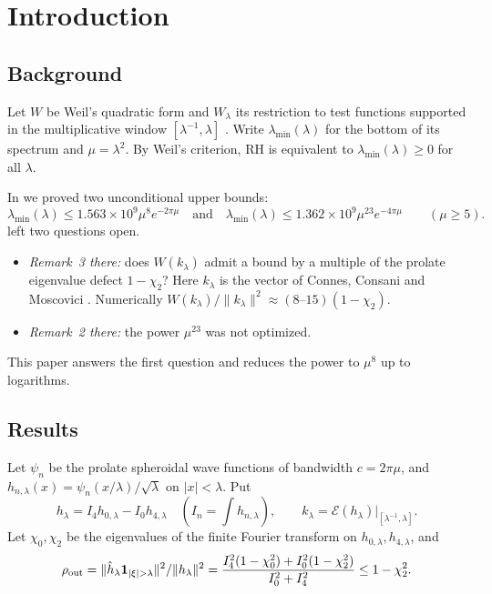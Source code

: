 \documentclass[11pt]{amsart}
\theoremstyle{remark}
\numberwithin{equation}{section}
\newcommand{\E}{\mathcal{E}}
\begin{document}
\begin{center}
\end{center}

\section{Introduction}

\subsection{Background}
Let $W$ be Weil's quadratic form and $W_\lambda$ its restriction to test functions supported in the multiplicative window $[\lambda^{-1},\lambda]$ \cite{CC21,CCM25}. Write $\lambda_{\min}(\lambda)$ for the bottom of its spectrum and $\mu=\lambda^2$. By Weil's criterion, RH is equivalent to $\lambda_{\min}(\lambda)\ge0$ for all $\lambda$.

In \cite{MoriWWUB} we proved two unconditional upper bounds:
\[
\lambda_{\min}(\lambda)\le1.563\times10^9\mu^8e^{-2\pi\mu}
\quad\text{and}\quad
\lambda_{\min}(\lambda)\le1.362\times10^9\mu^{23}e^{-4\pi\mu}\qquad(\mu\ge5).
\]
\cite{MoriWWUB} left two questions open.
\begin{itemize}
\item \emph{Remark~3 there:} does $W(k_\lambda)$ admit a bound by a multiple of the prolate eigenvalue defect $1-\chi_2$? Here $k_\lambda$ is the vector of Connes, Consani and Moscovici \cite[\S7]{CCM25}. Numerically $W(k_\lambda)/\|k_\lambda\|^2\approx(8\text{--}15)(1-\chi_2)$.
\item \emph{Remark~2 there:} the power $\mu^{23}$ was not optimized.
\end{itemize}
This paper answers the first question and reduces the power to $\mu^8$ up to logarithms.

\subsection{Results}
Let $\psi_n$ be the prolate spheroidal wave functions of bandwidth $c=2\pi\mu$, and $h_{n,\lambda}(x)=\psi_n(x/\lambda)/\sqrt\lambda$ on $|x|<\lambda$. Put
\[
h_\lambda=I_4h_{0,\lambda}-I_0h_{4,\lambda}\quad(I_n=\textstyle\int h_{n,\lambda}),\qquad k_\lambda=\E(h_\lambda)|_{[\lambda^{-1},\lambda]}.
\]
Let $\chi_0,\chi_2$ be the eigenvalues of the finite Fourier transform on $h_{0,\lambda},h_{4,\lambda}$, and
\[
\rho_{\rm out}=\|\hat h_\lambda\mathbf 1_{|\xi|>\lambda}\|^2/\|h_\lambda\|^2=\frac{I_4^2(1-\chi_0^2)+I_0^2(1-\chi_2^2)}{I_0^2+I_4^2}\le1-\chi_2^2 .
\]
\end{document}
